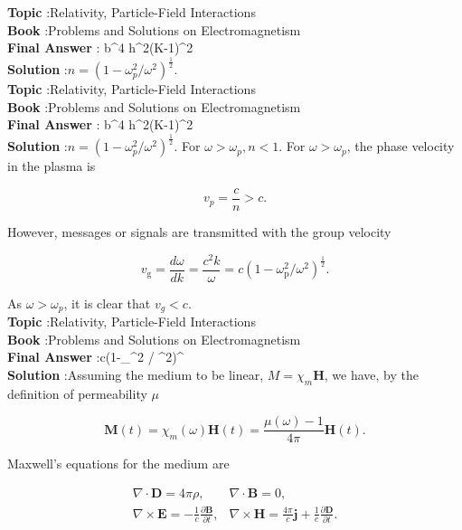 \documentclass[10pt]{article}
\begin{document}
\textbf{Topic} :Relativity, Particle-Field Interactions\\
\textbf{Book} :Problems and Solutions on Electromagnetism\\
\textbf{Final Answer} : b^{4} h^{2}(K-1)^{2} \\


\textbf{Solution} :$n=\left(1-\omega_{p}^{2} / \omega^{2}\right)^{\frac{1}{2}}$.
\\
\textbf{Topic} :Relativity, Particle-Field Interactions\\
\textbf{Book} :Problems and Solutions on Electromagnetism\\
\textbf{Final Answer} : b^{4} h^{2}(K-1)^{2} \\


\textbf{Solution} :$n=\left(1-\omega_{p}^{2} / \omega^{2}\right)^{\frac{1}{2}}$.
 For $\omega>\omega_{p}, n<1$.
 For $\omega>\omega_{p}$, the phase velocity in the plasma is

$$
v_{p}=\frac{c}{n}>c .
$$

However, messages or signals are transmitted with the group velocity

$$
v_{\mathrm{g}}=\frac{d \omega}{d k}=\frac{c^{2} k}{\omega}=c\left(1-\omega_{\mathrm{p}}^{2} / \omega^{2}\right)^{\frac{1}{2}} .
$$

As $\omega>\omega_{p}$, it is clear that $v_{g}<c$.
\\
\textbf{Topic} :Relativity, Particle-Field Interactions\\
\textbf{Book} :Problems and Solutions on Electromagnetism\\
\textbf{Final Answer} :c\left(1-\omega_{}^{2} / \omega^{2}\right)^{}\\


\textbf{Solution} :Assuming the medium to be linear, $M=\chi_{m} \mathbf{H}$, we have, by the definition of permeability $\mu$

$$
\mathbf{M}(t)=\chi_{m}(\omega) \mathbf{H}(t)=\frac{\mu(\omega)-1}{4 \pi} \mathbf{H}(t) .
$$

 Maxwell's equations for the medium are

$$
\begin{array}{ll}
\nabla \cdot \mathbf{D}=4 \pi \rho, & \nabla \cdot \mathbf{B}=0, \\
\nabla \times \mathbf{E}=-\frac{1}{c} \frac{\partial \mathbf{B}}{\partial t}, & \nabla \times \mathbf{H}=\frac{4 \pi}{c} \mathbf{j}+\frac{1}{c} \frac{\partial \mathbf{D}}{\partial t} .
\end{array}
$$
\end{document}
